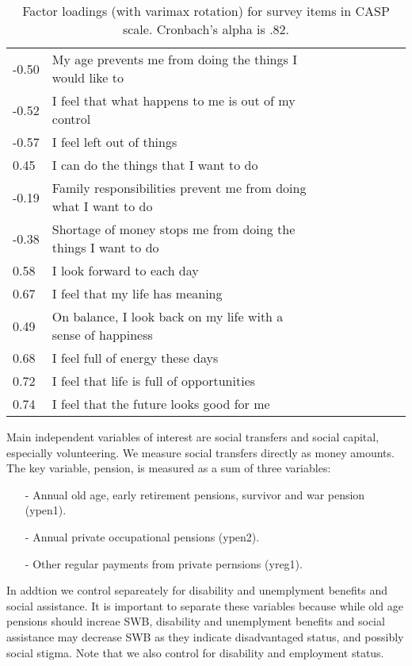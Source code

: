 \documentclass[10pt, letterpaper]{article}
\begin{document}
\begin{spacing}{1.4}
\begin{table}[h!]
  \centering
  \begin{tabular}{lllllllll} %
\hline
  -0.50& My age prevents me from doing the things I would like to\\
  -0.52& I feel that what happens to me is out of my control\\
  -0.57& I feel left out of things\\
   0.45& I can do the things that I want to do\\
  -0.19& Family responsibilities prevent me from doing what I want to do\\
  -0.38& Shortage of money stops me from doing the things I want to do\\
   0.58& I look forward to each day\\
   0.67& I feel that my life has meaning\\
   0.49& On balance, I look back on my life with a sense of happiness\\
   0.68& I feel full of energy these days\\
   0.72& I feel that life is full of opportunities\\
   0.74& I feel that the future looks good for me\\\hline
  \end{tabular}
  \caption{Factor loadings (with varimax rotation) for survey items in CASP scale. Cronbach's alpha is
    .82.}
  \label{casp}
\end{table}


Main independent variables of interest are social transfers and social capital,
especially volunteering. We  measure social transfers directly as money amounts. %
 The key variable, pension, is measured as a sum of three variables:
 \begin{spacing}{.9}
   \begin{itemize}
   \item[-] Annual old age, early retirement pensions, survivor and war pension
     (ypen1). %
   \item[-]  Annual private occupational pensions (ypen2). %
   \item[-] Other regular payments from private pernsions (yreg1). %
   \end{itemize}
 \end{spacing}


In addtion we control separeately for disability and unemplyment benefits and social
assistance. It is important to separate these variables because while old age
pensions should increae SWB, disability and unemplyment benefits and social
assistance may decrease SWB as they indicate disadvantaged status, and possibly
social stigma. Note that we also control for disability and employment status. 


\end{spacing}
\end{document}
